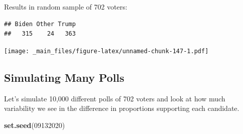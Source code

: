 \documentclass[]{book}
\newenvironment{Shaded}{\begin{snugshade}}{\end{snugshade}}
\newcommand{\KeywordTok}[1]{\textcolor[rgb]{0.13,0.29,0.53}{\textbf{#1}}}
\newcommand{\DecValTok}[1]{\textcolor[rgb]{0.00,0.00,0.81}{#1}}
\newcommand{\OperatorTok}[1]{\textcolor[rgb]{0.81,0.36,0.00}{\textbf{#1}}}
\newcommand{\NormalTok}[1]{#1}
\begin{document}
Results in random sample of 702 voters:

\begin{Shaded}
\end{Shaded}

\begin{verbatim}
## Biden Other Trump 
##   315    24   363
\end{verbatim}

\texttt{[image: \_main\_files/figure-latex/unnamed-chunk-147-1.pdf]}

\subsection{Simulating Many Polls}\label{simulating-many-polls}

Let's simulate 10,000 different polls of 702 voters and look at how much
variability we see in the difference in proportions supporting each
candidate.

\begin{Shaded}
\begin{Highlighting}[]
\KeywordTok{set.seed}\NormalTok{(}\DecValTok{09132020}\NormalTok{)}
\end{Highlighting}
\end{Shaded}
\end{document}
